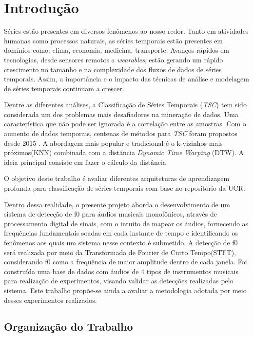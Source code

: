 
\chapter{Introdução} %

Séries estão presentes em diversos fenômenos ao nosso redor. Tanto em atividades humanas como processos naturais, as séries temporais estão presentes em domínios como: clima, economia, medicina, transporte. Avanços rápidos em tecnologias, desde sensores remotos a \textit{wearables}, estão gerando um rápido crescimento no tamanho e na complexidade dos fluxos de dados de séries temporais. Assim, a importância e o impacto das técnicas de análise e modelagem de séries temporais continuam a crescer.

Dentre as diferentes análises, a Classificação de Séries Temporais (\textit{TSC}) tem sido considerada um dos problemas mais desafiadores na mineração de dados. Uma característica que não pode ser ignorada é a correlação entre as amostras. Com o aumento de dados temporais, centenas de métodos para \textit{TSC} foram propostos desde 2015 \cite{Bagnall2017}. A abordagem mais popular e tradicional é o k-vizinhos mais próximos(KNN) combinada com a distância \textit{Dynamic Time Warping} (DTW). A ideia principal consiste em fazer o cálculo da distância 

O objetivo deste trabalho é avaliar diferentes arquiteturas de aprendizagem profunda para classificação de séries temporais com base no repositório da UCR.

Dentro dessa realidade, o presente projeto aborda o desenvolvimento de um sistema de detecção de f0 para áudios musicais monofônicos, através de processamento digital de sinais, com o intuito de mapear os áudios, fornecendo as frequências fundamentais soadas em cada instante de tempo e identificando os fenômenos aos quais um sistema nesse contexto é submetido. A detecção de f0 será realizada por meio da Transformada de Fourier de Curto Tempo(STFT), considerando f0 como a frequência de maior amplitude dentro de cada janela. Foi construída uma base de dados com áudios de 4 tipos de instrumentos musicais para realização de experimentos, visando validar as detecções realizadas pelo sistema. Este trabalho propõe-se ainda a avaliar a metodologia adotada por meio desses experimentos realizados. 
\section{Organização do Trabalho}



